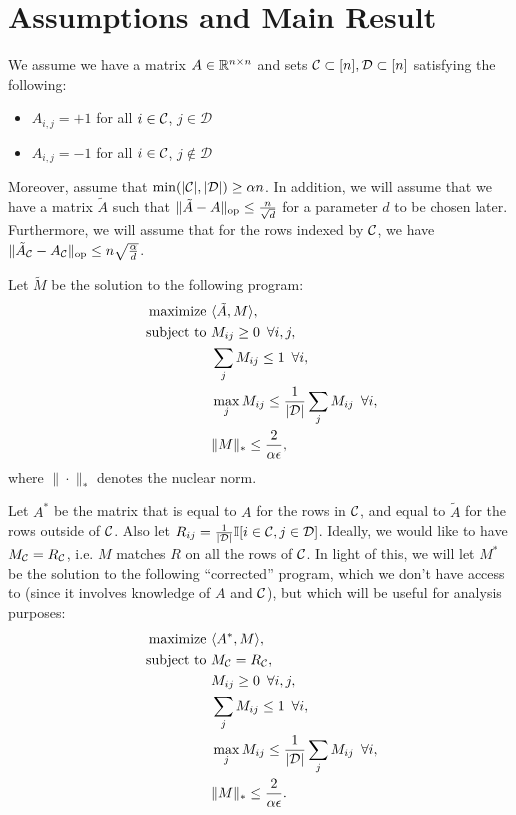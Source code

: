 \documentclass[11pt]{article}
\newcommand{\M}{\tilde{M}}
\newcommand{\Mm}{M^*}
\newcommand{\A}{\tilde{A}}
\newcommand{\Aa}{A^*}
\newcommand{\sD}{\mathcal{D}}
\begin{document}
\section{Assumptions and Main Result}
We assume we have a matrix $A \in \mathbb{R}^{n \times n}$ and sets 
$\sC \subset [n], \sD \subset [n]$ satisfying the following:
\begin{itemize}
\item $A_{i,j} = +1$ for all $i \in \mathcal{C}$, $j \in \sD$
\item $A_{i,j} = -1$ for all $i \in \mathcal{C}$, $j \not\in \sD$
\end{itemize}
Moreover, assume that $\min(|\sC|, |\sD|) \geq \alpha n$.
In addition, we will assume that we have a matrix $\A$ such 
that $\|\A-A\|_{\op} \leq \frac{n}{\sqrt{d}}$ for a parameter 
$d$ to be chosen later. Furthermore, we will assume that for the 
rows indexed by $\mathcal{C}$, we have $\|\A_{\sC}-A_{\sC}\|_{\op} \leq n\sqrt{\frac{\alpha}{d}}$.

Let $\M$ be the solution to the following program:
\begin{align}
\label{eq:optimization-noisy}
\text{maximize } &\langle \A, M \rangle, \\
\notag \text{ subject to } &M_{ij} \geq 0 \,\,\, \forall i,j, \\
\notag  &\sum_j M_{ij} \leq 1 \,\,\, \forall i, \\
\notag  &\max_j M_{ij} \leq \frac{1}{|\sD|}\sum_j M_{ij} \,\,\, \forall i, \\
\notag  &\|M\|_* \leq \frac{2}{\alpha\epsilon},
\end{align}
where $\|\cdot\|_*$ denotes the nuclear norm.

Let $\Aa$ be the matrix that is equal to $A$ for the rows in $\mathcal{C}$, 
and equal to $\A$ for the rows outside of $\mathcal{C}$. Also let $R_{ij} = \frac{1}{|\sD|}\bI[i \in \sC, j \in \sD]$. 
Ideally, we would like to have $M_{\mathcal{C}} = R_{\mathcal{C}}$, i.e. $M$ matches $R$ on 
all the rows of $\mathcal{C}$. In light of this, 
we will let $\Mm$ be the solution to the following ``corrected'' program, which 
we don't have access to (since it involves knowledge of $A$ and $\mathcal{C}$), but which 
will be useful for analysis purposes:
\begin{align}
\label{eq:optimization-noiseless}
\text{maximize } &\langle \Aa, M \rangle, \\
\notag \text{ subject to } &M_{\sC} = R_{\sC}, \\
\notag  &M_{ij} \geq 0 \,\,\, \forall i,j, \\
\notag  &\sum_j M_{ij} \leq 1 \,\,\, \forall i, \\
\notag  &\max_j M_{ij} \leq \frac{1}{|\sD|}\sum_j M_{ij} \,\,\, \forall i, \\
\notag  &\|M\|_* \leq \frac{2}{\alpha\epsilon}.
\end{align}
\end{document}
